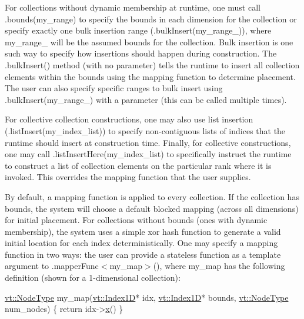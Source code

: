 For collections without dynamic membership at runtime, one must call {\ttfamily .bounds(my\+\_\+range)} to specify the bounds in each dimension for the collection or specify exactly one bulk insertion range ({\ttfamily .bulk\+Insert(my\+\_\+range\+\_)}), where {\ttfamily my\+\_\+range\+\_} will be the assumed bounds for the collection. Bulk insertion is one such way to specify how insertions should happen during construction. The {\ttfamily .bulk\+Insert()} method (with no parameter) tells the runtime to insert all collection elements within the bounds using the mapping function to determine placement. The user can also specify specific ranges to bulk insert using {\ttfamily .bulk\+Insert(my\+\_\+range\+\_)} with a parameter (this can be called multiple times).

For collective collection constructions, one may also use list insertion ({\ttfamily .list\+Insert(my\+\_\+index\+\_\+list)}) to specify non-\/contiguous lists of indices that the runtime should insert at construction time. Finally, for collective constructions, one may call {\ttfamily .list\+Insert\+Here(my\+\_\+index\+\_\+list)} to specifically instruct the runtime to construct a list of collection elements on the particular rank where it is invoked. This overrides the mapping function that the user supplies.

By default, a mapping function is applied to every collection. If the collection has bounds, the system will choose a default blocked mapping (across all dimensions) for initial placement. For collections without bounds (ones with dynamic membership), the system uses a simple xor hash function to generate a valid initial location for each index deterministically. One may specify a mapping function in two ways\+: the user can provide a stateless function as a template argument to {\ttfamily .mapper\+Func$<$my\+\_\+map$>$()}, where {\ttfamily my\+\_\+map} has the following definition (shown for a 1-\/dimensional collection)\+:


\begin{DoxyCode}
\hyperlink{namespacevt_a866da9d0efc19c0a1ce79e9e492f47e2}{vt::NodeType} my\_map(\hyperlink{structvt_1_1index_1_1_dense_index_array}{vt::Index1D}* idx, \hyperlink{structvt_1_1index_1_1_dense_index_array}{vt::Index1D}* bounds, 
      \hyperlink{namespacevt_a866da9d0efc19c0a1ce79e9e492f47e2}{vt::NodeType} num\_nodes) \{
    \textcolor{keywordflow}{return} idx->\hyperlink{structvt_1_1index_1_1_dense_index_array_a0604b24914af854d09d4da97eae4ef74}{x}() %
\}
\end{DoxyCode}


